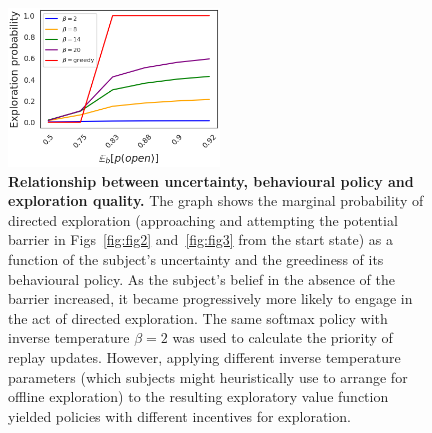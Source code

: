 \begin{figure}[h!]
    \centering
    \includegraphics[width=0.5\textwidth]{Figures/supp/supp6.png}
    \caption{\textbf{Relationship between uncertainty, behavioural policy and exploration quality.} The graph shows the marginal probability of directed exploration (approaching and attempting the potential barrier in Figs~\ref{fig:fig2} and~\ref{fig:fig3} from the start state) as a function of the subject's uncertainty and the greediness of its behavioural policy. As the subject's belief in the absence of the barrier increased, it became progressively more likely to engage in the act of directed exploration. The same softmax policy with inverse temperature $\beta=2$ was used to calculate the priority of replay updates. However, applying different inverse temperature parameters (which subjects might heuristically use to arrange for offline exploration) to the resulting exploratory value function yielded policies with different incentives for exploration.}
    \label{fig:supp6}
\end{figure}
